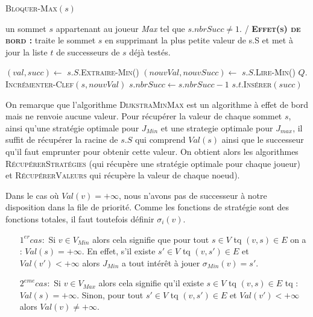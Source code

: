 \begin{algorithm}
	\caption{\textsc {Bloquer-Max}$(s)$}
	 \label{algo:bloquerMax}
	\begin{algorithmic}[1]
		\REQUIRE un sommet $s$ appartenant au joueur \textit{Max} tel que $s.nbrSucc \neq 1$.
		\ENSURE / \textbf{\textsc{Effet(s) de bord :}} traite le sommet $s$ en supprimant la plus petite valeur de s.S et met
		à jour la liste $t$ de successeurs de $s$ déjà testés.
		
			\STATE $(val,succ) \leftarrow$ $s.S.$\textsc{Extraire-Min}() \label{lalgo:bloc1}
			\STATE $(nouvVal,nouvSucc) \leftarrow$ $s.S.$\textsc{Lire-Min}()
			\STATE $Q.$\textsc{Incrémenter-Clef}$(s,nouvVal)$ \label{lalgo:bloc2}
			\STATE $s.nbrSucc \leftarrow s.nbrSucc - 1 $
			\STATE $s.t.$\textsc{Insérer}$(succ)$
			
				
			
\end{algorithmic}
		
\end{algorithm}

\FloatBarrier




On remarque que l'algorithme \textsc{DijkstraMinMax}  est un algorithme à effet de bord mais ne renvoie aucune valeur. Pour récupérer la valeur de chaque sommet $s$, ainsi qu'une stratégie optimale pour $J_{Min}$ et une strategie optimale pour $J_{max}$, il suffit de récupérer la racine de $s.S$ qui comprend $Val(s)$ ainsi que le successeur qu'il faut emprunter pour obtenir cette valeur. On obtient alors les algorithmes \textsc{RécupérerStratégies} (qui récupère une stratégie optimale pour chaque joueur) et \textsc{RécupérerValeurs} qui récupère la valeur de chaque noeud).

\begin{rem}
	
	Dans le cas où $Val(v) = +\infty$, nous n'avons pas de successeur à notre disposition dans la file de priorité. Comme les fonctions de stratégie sont des fonctions totales, il faut toutefois définir $\sigma _{i} (v)$.
\begin{enumerate}
	\item[$1^{er} cas:$] Si $v \in V_{Min}$ alors cela signifie que pour tout $s \in V$ tq $(v,s) \in E$ on a : $Val(s) = +\infty$. En effet, s'il existe $s' \in V$ tq $(v,s')\in E$ et $Val(v') < +\infty$ alors $J_{Min}$ a tout intérêt à jouer $\sigma _{Min}(v) = s'$.
	\item[$2^{eme} cas:$] Si $v \in V_{Max}$ alors cela signifie qu'il existe $s \in V$ tq $(v,s) \in E$ tq : $Val(s) = +\infty$. Sinon, pour tout $s' \in V$ tq $(v,s') \in E$ et $Val(v') < +\infty$ alors $Val(v) \neq +\infty$. 
	
\end{enumerate}

\end{rem}

